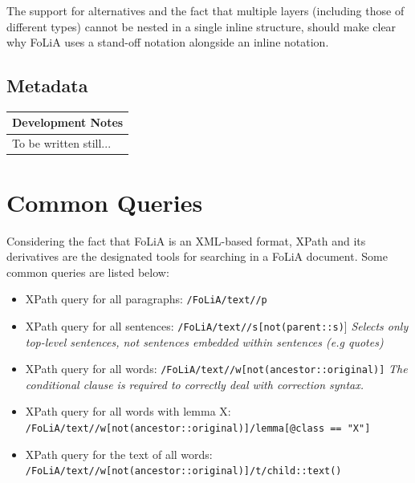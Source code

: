 \documentclass[a4paper,12pt]{report}
\newenvironment{devnotes}
{
\begin{center}
    \begin{tabular}[h!]{|p{0.8\textwidth}|}
    \hline
    {\bf Development Notes}\\\hline}
{   \\\hline
    \end{tabular}
\end{center}}
\begin{document}
The support for alternatives and the fact that multiple layers (including those of different types) cannot be nested in a single inline structure, should make clear why FoLiA uses a stand-off notation alongside an inline notation. 


\section{Metadata}


\begin{devnotes}
To be written still...
\end{devnotes}


\appendix
\chapter{Common Queries}

Considering the fact that FoLiA is an XML-based format, XPath and its derivatives are the designated tools for searching in a FoLiA document. Some common queries are listed below:

\begin{itemize}
\item XPath query for all paragraphs: \texttt{/FoLiA/text//p}
\item XPath query for all sentences: \texttt{/FoLiA/text//s[not(parent::s)}] \emph{Selects only top-level sentences, not sentences embedded within sentences (e.g quotes)}
\item XPath query for all words: \texttt{/FoLiA/text//w[not(ancestor::original)]} \emph{The conditional clause is required to correctly deal with correction syntax.}
\item XPath query for all words with lemma X: \\ \texttt{/FoLiA/text//w[not(ancestor::original)]/lemma[@class == "X"]}
\item XPath query for the text of all words: \\ \texttt{/FoLiA/text//w[not(ancestor::original)]/t/child::text()}
\end{itemize}






\end{document}
